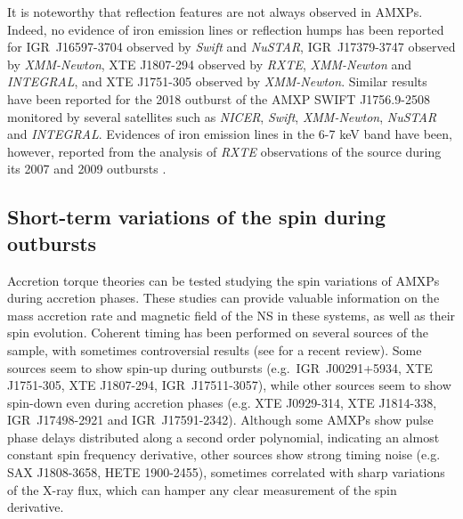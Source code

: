 \documentclass[graybox]{svmult}
\def \inte {{\em INTEGRAL\xspace}}
\def \swift {{\em Swift\xspace}}
\def \xmm {{\em XMM-Newton\xspace}}
\def \rxte {{\em RXTE\xspace}}
\def \nustar{{\em NuSTAR\xspace}}
\def \nicer{{\em NICER\xspace}}
\begin{document}
It is noteworthy that reflection features are not always observed in AMXPs. Indeed, no evidence of iron emission lines or reflection humps has been reported for IGR~J16597-3704 \cite{Sanna2018a} observed by \swift{} and \nustar{}, IGR~J17379-3747 \cite{Sanna2018b} observed by \xmm{}, XTE J1807-294 \cite{Falanga2005a} observed by \rxte{}, \xmm{} and \inte{}, and XTE J1751-305 \cite{Miller2003} observed by \xmm{}. Similar results have been reported for the 2018 outburst of the AMXP SWIFT J1756.9-2508 monitored by several satellites such as \nicer{}, \swift{}, \xmm{}, \nustar{} and \inte{}.  Evidences of iron emission lines in the 6-7 keV band have been, however, reported from the analysis of \rxte{} observations of the source during its 2007 and 2009 outbursts \cite{Patruno2010c}.

\subsection{Short-term variations of the spin during outbursts}

Accretion torque theories can be tested studying the spin variations of AMXPs during accretion phases. These studies can provide valuable information on the mass accretion rate and magnetic field of the NS in these systems, as well as their spin evolution. Coherent timing has been performed on several sources of the sample, with sometimes controversial results (see \cite{Campana2018} for a recent review). Some sources seem to show spin-up during outbursts (e.g.\ IGR~J00291+5934, XTE J1751-305, XTE J1807-294, IGR~J17511-3057), while other sources seem to show spin-down even during accretion phases (e.g. XTE J0929-314,  XTE J1814-338, IGR~J17498-2921 and IGR~J17591-2342). Although some AMXPs show pulse phase delays distributed along a second order polynomial, indicating an almost constant spin frequency derivative, other sources show strong timing noise (e.g. SAX J1808-3658, HETE 1900-2455), sometimes correlated with sharp variations of the X-ray flux, which can hamper any clear measurement of the spin derivative.
\end{document}
